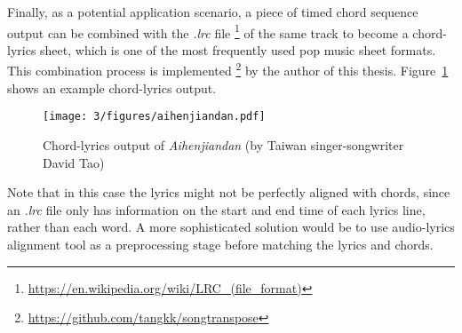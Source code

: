 Finally, as a potential application scenario, a piece of timed chord sequence output can be combined with the \textit{.lrc} file \footnote{\url{https://en.wikipedia.org/wiki/LRC\_(file\_format)}} of the same track to become a chord-lyrics sheet, which is one of the most frequently used pop music sheet formats. This combination process is implemented \footnote{\url{https://github.com/tangkk/songtranspose}} by the author of this thesis. Figure~\ref{fig:3-aihenjiandan} shows an example chord-lyrics output.
\begin{figure}[h]
    \centering
        \texttt{[image: 3/figures/aihenjiandan.pdf]}
    \caption{Chord-lyrics output of \textit{Aihenjiandan} (by Taiwan singer-songwriter David Tao)}
    \label{fig:3-aihenjiandan}
\end{figure}
Note that in this case the lyrics might not be perfectly aligned with chords, since an \textit{.lrc} file only has information on the start and end time of each lyrics line, rather than each word. A more sophisticated solution would be to use audio-lyrics alignment tool \cite{mauch2010lyrics} as a preprocessing stage before matching the lyrics and chords.



